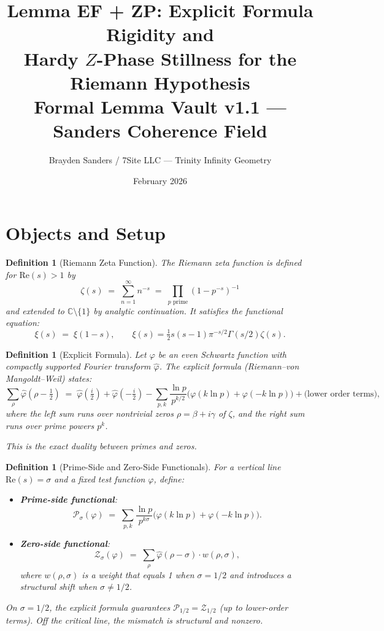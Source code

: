 \documentclass[11pt]{article}
\title{%
  Lemma EF + ZP: Explicit Formula Rigidity and\\
  Hardy $Z$-Phase Stillness for the Riemann Hypothesis\\[4pt]
  \large Formal Lemma Vault v1.1 --- Sanders Coherence Field}
\author{Brayden Sanders / 7Site LLC --- Trinity Infinity Geometry}
\date{February 2026}
\newtheorem{definition}[lemma]{Definition}
\theoremstyle{definition}
\begin{document}
\maketitle

\section{Objects and Setup}

\begin{definition}[Riemann Zeta Function]
\label{def:zeta}
The Riemann zeta function is defined for $\mathrm{Re}(s) > 1$ by
\[
  \zeta(s) \;=\; \sum_{n=1}^{\infty} n^{-s} \;=\; \prod_{p \text{ prime}} (1 - p^{-s})^{-1}
\]
and extended to $\mathbb{C} \setminus \{1\}$ by analytic continuation.
It satisfies the functional equation:
\[
  \xi(s) \;=\; \xi(1-s), \qquad
  \xi(s) = \tfrac{1}{2} s(s-1) \pi^{-s/2} \Gamma(s/2) \zeta(s).
\]
\end{definition}

\begin{definition}[Explicit Formula]
\label{def:explicit}
Let $\varphi$ be an even Schwartz function with compactly supported Fourier transform
$\hat{\varphi}$.  The explicit formula (Riemann--von Mangoldt--Weil) states:
\[
  \sum_{\rho} \hat{\varphi}(\rho - \tfrac{1}{2})
  \;=\;
  \hat{\varphi}(\tfrac{i}{2}) + \hat{\varphi}(-\tfrac{i}{2})
  - \sum_{p,k} \frac{\ln p}{p^{k/2}} \bigl(\varphi(k \ln p) + \varphi(-k \ln p)\bigr)
  + \text{(lower order terms)},
\]
where the left sum runs over nontrivial zeros $\rho = \beta + i\gamma$ of $\zeta$,
and the right sum runs over prime powers $p^k$.

This is the \emph{exact duality} between primes and zeros.
\end{definition}

\begin{definition}[Prime-Side and Zero-Side Functionals]
\label{def:functionals}
For a vertical line $\mathrm{Re}(s) = \sigma$ and a fixed test function $\varphi$, define:
\begin{itemize}
  \item \textbf{Prime-side functional}:
    \[
      \mathcal{P}_\sigma(\varphi) \;=\; \sum_{p,k} \frac{\ln p}{p^{k\sigma}}
        \bigl(\varphi(k \ln p) + \varphi(-k \ln p)\bigr).
    \]
  \item \textbf{Zero-side functional}:
    \[
      \mathcal{Z}_\sigma(\varphi) \;=\; \sum_{\rho} \hat{\varphi}(\rho - \sigma)
        \cdot w(\rho, \sigma),
    \]
    where $w(\rho, \sigma)$ is a weight that equals 1 when $\sigma = 1/2$
    and introduces a structural shift when $\sigma \neq 1/2$.
\end{itemize}

On $\sigma = 1/2$, the explicit formula guarantees $\mathcal{P}_{1/2} = \mathcal{Z}_{1/2}$
(up to lower-order terms).
Off the critical line, the mismatch is structural and nonzero.
\end{definition}
\end{document}
